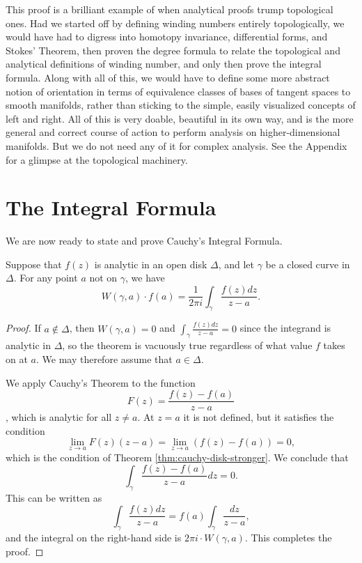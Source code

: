 This proof is a brilliant example of when analytical proofs trump topological ones. Had we started off by defining winding numbers entirely topologically, we would have had to digress into homotopy invariance, differential forms, and Stokes' Theorem, then proven the degree formula to relate the topological and analytical definitions of winding number, and only then prove the integral formula. Along with all of this, we would have to define some more abstract notion of orientation in terms of equivalence classes of bases of tangent spaces to smooth manifolds, rather than sticking to the simple, easily visualized concepts of left and right. All of this is very doable, beautiful in its own way, and is the more general and correct course of action to perform analysis on higher-dimensional manifolds. But we do not need any of it for complex analysis. See the Appendix for a glimpse at the topological machinery.

\section{The Integral Formula}
We are now ready to state and prove Cauchy's Integral Formula.

\begin{theorem}
\label{thm:cauchy-integral-formula}
Suppose that $f(z)$ is analytic in an open disk $\Delta$, and let $\gamma$ be a closed curve in $\Delta$. For any point $a$ not on $\gamma$, we have $$W(\gamma, a) \cdot f(a)=\dfrac{1}{2\pi i}\int_{\gamma} \dfrac{f(z)dz}{z-a}.$$
\end{theorem}
\begin{proof}
If $a \notin \Delta$, then $W(\gamma, a)=0$ and $\int_{\gamma} \frac{f(z)dz}{z-a}=0$ since the integrand is analytic in $\Delta$, so the theorem is vacuously true regardless of what value $f$ takes on at $a$. We may therefore assume that $a \in \Delta$.

We apply Cauchy's Theorem to the function $$F(z)=\dfrac{f(z)-f(a)}{z-a}$$, which is analytic for all $z \neq a$. At $z=a$ it is not defined, but it satisfies the condition $$\lim_{z \rightarrow a}F(z)(z-a)=\lim_{z \rightarrow a}(f(z)-f(a))=0,$$ which is the condition of Theorem \ref{thm:cauchy-disk-stronger}. We conclude that $$\int_{\gamma} \dfrac{f(z)-f(a)}{z-a}dz=0.$$ This can be written as $$\int_{\gamma} \dfrac{f(z)dz}{z-a}=f(a)\int_{\gamma} \dfrac{dz}{z-a},$$ and the integral on the right-hand side is $2\pi i \cdot W(\gamma, a)$. This completes the proof.
\end{proof}

